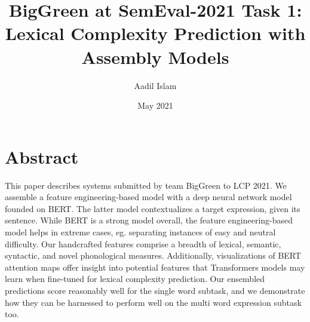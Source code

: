 \documentclass{dcthesis}
\title{BigGreen at SemEval-2021 Task 1: \\Lexical Complexity Prediction with Assembly Models}
\author{Aadil Islam}
\date{May 2021}
\theoremstyle{definition}
\theoremstyle{remark}
\begin{document}
\frontmatter

\maketitle
\restoregeometry

\chapter*{Abstract}
This paper describes systems submitted by team BigGreen to LCP 2021. We assemble a feature engineering-based model with a deep neural network model founded on BERT. The latter model contextualizes a target expression, given its sentence. While BERT is a strong model overall, the feature engineering-based model helps in extreme cases, eg. separating instances of easy and neutral difficulty. Our handcrafted features comprise a breadth of lexical, semantic, syntactic, and novel phonological measures. Additionally, visualizations of BERT attention maps offer insight into potential features that Transformers models may learn when fine-tuned for lexical complexity prediction. Our ensembled predictions score reasonably well for the single word subtask, and we demonstrate how they can be harnessed to perform well on the multi word expression subtask too.


\tableofcontents



\mainmatter

\end{document}
